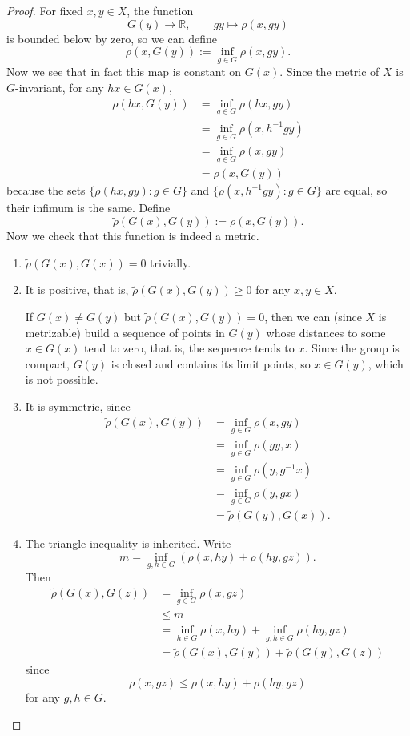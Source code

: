 \begin{proof}
For fixed $x,y\in X$, the function
$$
G(y)\to\mathbb{R},
\qquad
gy\mapsto\rho(x,gy)
$$
is bounded below by zero, so we can
define
$$
\rho(x,G(y))
:=\inf_{g\in G}\rho(x,gy).
$$
Now we see that in fact this map is
constant on $G(x)$. Since the metric of
$X$ is $G$-invariant, for any
$hx\in G(x)$,
$$
\begin{aligned}
\rho(hx,G(y))
&=\inf_{g\in G}\rho(hx,gy) \\
&=\inf_{g\in G}\rho(x,h^{-1}gy) \\
&=\inf_{g\in G}\rho(x,gy) \\
&=\rho(x,G(y))
\end{aligned}
$$
because the sets
$\{\rho(hx,gy):g\in G\}$ and
$\{\rho(x,h^{-1}gy):g\in G\}$ are
equal, so their infimum is the same.
Define
$$
\tilde{\rho}(G(x),G(y))
:=\rho(x,G(y)).
$$
Now we check that this function is
indeed a metric.
\begin{enumerate}
\item $\tilde{\rho}(G(x),G(x))=0$
trivially.

\item It is positive, that is,
$\tilde{\rho}(G(x),G(y))\geq0$ for any
$x,y\in X$.

If $G(x)\neq G(y)$ but
$\tilde{\rho}(G(x),G(y))=0$, then we
can (since $X$ is metrizable) build a
sequence of points in $G(y)$ whose
distances to some $x\in G(x)$ tend to
zero, that is, the sequence tends to
$x$. Since the group is compact, $G(y)$
is closed and contains its limit
points, so $x\in G(y)$, which is not
possible.

\item It is symmetric, since
$$
\begin{aligned}
\tilde{\rho}(G(x),G(y))
&=\inf_{g\in G}\rho(x,gy) \\
&=\inf_{g\in G}\rho(gy,x) \\
&=\inf_{g\in G}\rho(y,g^{-1}x) \\
&=\inf_{g\in G}\rho(y,gx) \\
&=\tilde{\rho}(G(y),G(x)).
\end{aligned}
$$

\item The triangle inequality is
inherited. Write
$$
m=\inf_{g,h\in G}
\left(\rho(x,hy)+\rho(hy,gz)\right).
$$
Then
$$
\begin{aligned}
\tilde{\rho}(G(x),G(z))
&=\inf_{g\in G}\rho(x,gz) \\
&\leq m \\
&=\inf_{h\in G}\rho(x,hy)
 +\inf_{g,h\in G}\rho(hy,gz) \\
&=\tilde{\rho}(G(x),G(y))
 +\tilde{\rho}(G(y),G(z))
\end{aligned}
$$
since
$$
\rho(x,gz)
\leq\rho(x,hy)+\rho(hy,gz)
$$
for any $g,h\in G$.
\end{enumerate}


\end{proof}
